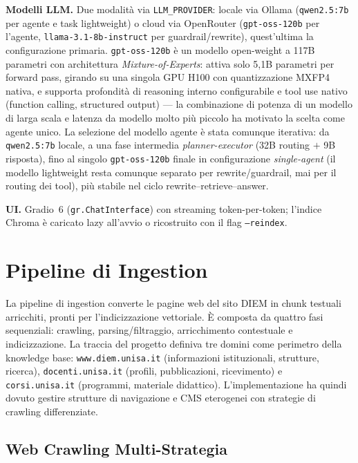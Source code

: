 \documentclass[11pt,a4paper]{article}
\newcommand{\code}[1]{\texttt{\small#1}}
\begin{document}
\textbf{Modelli LLM.} Due modalità via \code{LLM\_PROVIDER}: locale via Ollama
(\code{qwen2.5:7b} per agente e task lightweight) o cloud via OpenRouter
(\code{gpt-oss-120b} per l'agente, \code{llama-3.1-8b-instruct} per guardrail/rewrite),
quest'ultima la configurazione primaria. \code{gpt-oss-120b} è un modello open-weight a
117B parametri con architettura \emph{Mixture-of-Experts}: attiva solo 5,1B parametri
per forward pass, girando su una singola GPU H100 con quantizzazione MXFP4 nativa, e
supporta profondità di reasoning interno configurabile e tool use
nativo (function calling, structured output) \citep{openrouter2026gptoss120b} --- la combinazione di potenza di un
modello di larga scala e latenza da modello molto più piccolo ha motivato la scelta come
agente unico. La selezione del modello agente è stata comunque iterativa: da
\code{qwen2.5:7b} locale, a una fase intermedia \emph{planner-executor} (32B routing
$+$ 9B risposta), fino al singolo \code{gpt-oss-120b} finale in configurazione
\emph{single-agent} (il modello lightweight resta comunque separato per rewrite/guardrail,
mai per il routing dei tool), più stabile nel ciclo rewrite--retrieve--answer.

\textbf{UI.} Gradio~6 (\code{gr.ChatInterface}) con streaming token-per-token; l'indice
Chroma è caricato lazy all'avvio o ricostruito con il flag \code{--reindex}.

\section{Pipeline di Ingestion}
\label{sec:ingestion}

La pipeline di ingestion converte le pagine web del sito DIEM in chunk testuali
arricchiti, pronti per l'indicizzazione vettoriale. È composta da quattro fasi sequenziali:
crawling, parsing/filtraggio, arricchimento contestuale e indicizzazione. La traccia del
progetto definiva tre domini come perimetro della knowledge base:
\texttt{www.diem.unisa.it} (informazioni istituzionali, strutture, ricerca),
\texttt{docenti.unisa.it} (profili, pubblicazioni, ricevimento) e \texttt{corsi.unisa.it}
(programmi, materiale didattico). L'implementazione ha quindi dovuto gestire strutture di
navigazione e CMS eterogenei con strategie di crawling differenziate.

\subsection{Web Crawling Multi-Strategia}
\label{sec:crawling}
\end{document}
